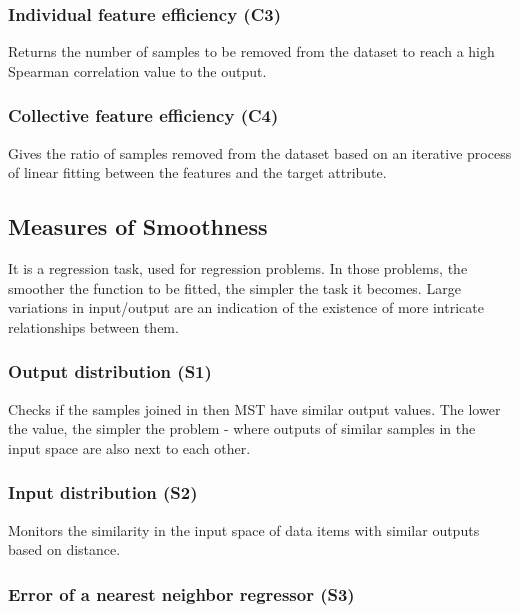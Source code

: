 \subsubsection{Individual feature efficiency (C3)}

Returns the number of samples to be removed from the dataset to reach a high 
Spearman correlation value to the output.

\subsubsection{Collective feature efficiency (C4)}

Gives the ratio of samples removed from the dataset based on an iterative 
process of linear fitting between the features and the target attribute.

\subsection{Measures of Smoothness}\label{sec:smoothness}

It is a regression task, used for regression problems. In those problems, the 
smoother the function to be fitted, the simpler the task it becomes. Large 
variations in input/output are an indication of the existence of more intricate 
relationships between them.

\subsubsection{Output distribution (S1)}

Checks if the samples joined in then MST have similar output values. The lower 
the value, the simpler the problem - where outputs of similar samples in the 
input space are also next to each other.

\subsubsection{Input distribution (S2)}

Monitors the similarity in the input space of data items with similar outputs
based on distance.

\subsubsection{Error of a nearest neighbor regressor (S3)}

